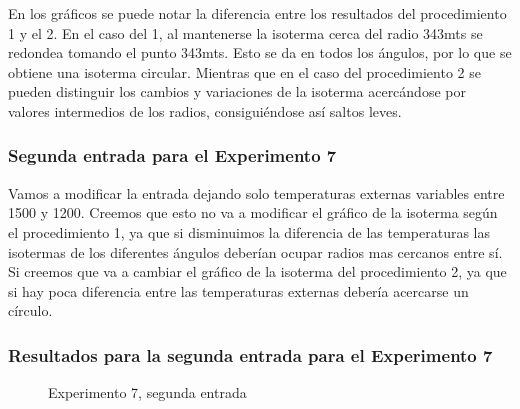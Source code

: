 \par En los gráficos se puede notar la diferencia entre los resultados del procedimiento 1 y el 2. En el caso del 1, al mantenerse la isoterma cerca del radio 343mts se redondea tomando el punto 343mts. Esto se da en todos los ángulos, por lo que se obtiene una isoterma circular. Mientras que en el caso del procedimiento 2 se pueden distinguir los cambios y variaciones de la isoterma acercándose por valores intermedios de los radios, consiguiéndose así saltos leves.

\subsubsection{Segunda entrada para el Experimento 7}
\par Vamos a modificar la entrada dejando solo temperaturas externas variables entre 1500 y 1200. Creemos que esto no va a modificar el gráfico de la isoterma según el procedimiento 1, ya que si disminuimos la diferencia de las temperaturas las isotermas de los diferentes ángulos deberían ocupar radios mas cercanos entre sí. Si creemos que va a cambiar el gráfico de la isoterma del procedimiento 2, ya que si hay poca diferencia entre las temperaturas externas debería acercarse un círculo.

\subsubsection{Resultados para la segunda entrada para el Experimento 7}

\begin{figure}[ht]
\begin{center}
\caption{Experimento 7, segunda entrada}
\end{center}
\end{figure}

